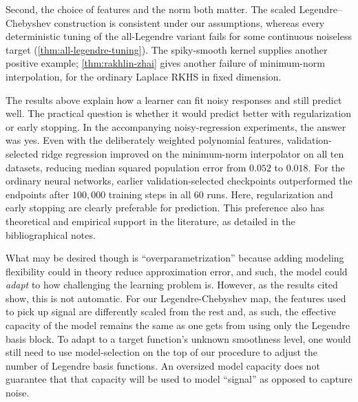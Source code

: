 \documentclass[11pt,twoside]{article}
\theoremstyle{definition}
\theoremstyle{remark}
\begin{document}
Second,
the choice of features and the norm both matter. The scaled
Legendre--Chebyshev construction is consistent under our assumptions,
whereas every deterministic tuning of the all-Legendre variant fails for
some continuous noiseless target (\cref{thm:all-legendre-tuning}).
The spiky-smooth kernel supplies
another positive example; \cref{thm:rakhlin-zhai} gives another failure of
minimum-norm interpolation, for the ordinary Laplace RKHS in fixed dimension.

The results above explain how a learner can fit noisy responses and still
predict well. The practical question is whether it would predict better
with regularization or early stopping. In the accompanying noisy-regression
experiments, the answer was yes. Even with the deliberately weighted
polynomial features, validation-selected ridge regression improved on the
minimum-norm interpolator on all ten datasets, reducing median squared
population error from $0.052$ to $0.018$. For the ordinary neural networks,
earlier validation-selected checkpoints outperformed the endpoints after
$100{,}000$ training steps in all $60$ runs.\label{en:regularization-comparison}
Here, regularization and early stopping are clearly preferable for
prediction. This preference also has theoretical and empirical support in
the literature, as detailed in the bibliographical notes.

What may be desired though is ``overparametrization'' because 
adding modeling flexibility could in theory reduce approximation error,
and such, the model could \emph{adapt} to how challenging the learning 
problem is.
However, as the results cited show, this is not automatic.
For our Legendre-Chebyshev map, the features used to pick up signal
are differently scaled from the rest and, as such, the effective
capacity of the model remains the same as one gets from using only 
the Legendre basis block. 
To adapt to a target function's unknown smoothness level,
one would still need to use model-selection on the top
of our procedure to adjust the number of Legendre basis functions.
An oversized model capacity does not guarantee that that capacity will
be used to model ``signal'' as opposed to capture noise.
\end{document}
